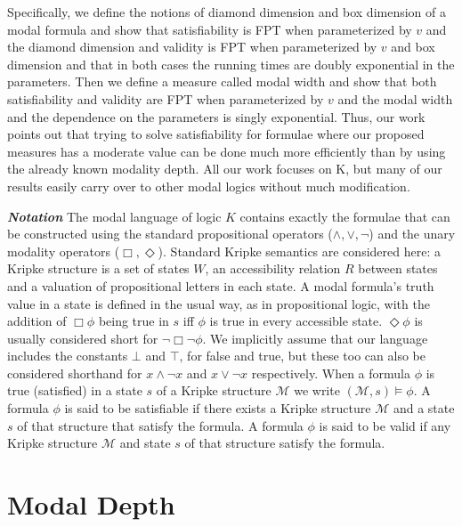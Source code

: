 \documentclass{llncs}
\begin{document}
Specifically, we define the notions of diamond dimension and box
dimension of a modal formula and show that satisfiability is FPT
when parameterized by $v$ and the diamond dimension and validity is
FPT when parameterized by $v$ and box dimension and that in both
cases the running times are doubly exponential in the parameters.
Then we define a measure called modal width and show that both
satisfiability and validity are FPT when parameterized by $v$ and
the modal width and the dependence on the parameters is singly
exponential. Thus, our work points out that trying to solve satisfiability for
formulae where our proposed measures has a moderate value can be done much more
efficiently than by using the already known modality depth. All our work
focuses on K, but many of our results easily carry over to other modal logics
without much modification.



\textit{\textbf{Notation}}
The modal language of logic $K$ contains exactly the formulae that can be
constructed using the standard propositional operators ($\land,\lor,\neg$) and
the unary modality operators ($\Box,\Diamond$).  Standard Kripke semantics are
considered here: a Kripke structure is a set of states $W$, an accessibility
relation $R$ between states and a valuation of propositional letters in each
state. A modal formula's truth value in a state is defined in the usual way, as
in propositional logic, with the addition of $\Box \phi$ being true in $s$ iff
$\phi$ is true in every accessible state.  $\Diamond \phi$ is usually
considered short for $\neg \Box \neg \phi$.  We implicitly assume that our
language includes the constants $\bot$ and $\top$, for false and true, but
these too can also be considered shorthand for $x\land \neg x$ and $x\lor \neg
x$ respectively. When a formula $\phi$ is true (satisfied) in a state $s$ of a Kripke
structure $\mathcal{M}$ we write $(\mathcal{M},s) \models \phi $. A formula $\phi$ is said to be satisfiable if there exists a Kripke structure $\mathcal{M}$ and a state $s$ of that structure that satisfy the formula.
A formula $\phi$ is said to be valid if any Kripke structure $\mathcal{M}$ and state $s$ of that structure satisfy the formula.





\section{Modal Depth} \label{sec:depth}
\end{document}
